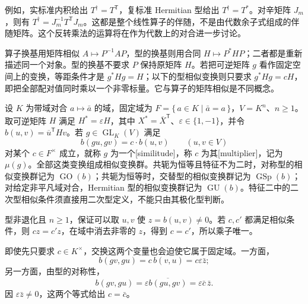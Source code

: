例如，实标准内积给出 \(T^\dagger=T^{\mathsf T}\)，复标准 Hermitian 型给出 \(T^\dagger=T^*\)。对辛矩阵 \(J_m\)，则有 \(T^\dagger=J_m^{-1}T^{\mathsf T}J_m\)。这都是整个线性算子的伴随，不是由代数余子式组成的伴随矩阵。这个反转乘法的运算将在作为代数上的对合进一步讨论。

\ProseParagraphBreak
算子换基用矩阵相似 \(A\mapsto P^{-1}AP\)，型的换基则用合同 \(H\mapsto P^*HP\)；二者都是重新描述同一个对象。型的换基不要求 \(P\) 保持原矩阵 \(H\)。若把可逆矩阵 \(g\) 看作固定空间上的变换，等距条件才是 \(g^*Hg=H\)；以下的型相似变换则只要求 \(g^*Hg=cH\)，即把全部配对值同时乘以一个非零标量。它与算子的矩阵相似是不同概念。

\begin{definition}\label{b2:def:form-similitude}
	设 \(K\) 为带域对合 \(a\mapsto\bar a\) 的域，固定域为 \(F=\{\,a\in K\mid\bar a=a\,\}\)，\(V=K^n\)、\(n\ge1\)。取可逆矩阵 \(H\) 满足 \(H^*=\varepsilon H\)，其中 \(X^*=\overline X^{\mathsf T}\)、\(\varepsilon\in\{1,-1\}\)，并令 \(b(u,v)=\overline u^{\mathsf T}Hv\)。若 \(g\in\operatorname{GL}_K(V)\) 满足
	\[
		b(gu,gv)=c\cdot b(u,v)\qquad(u,v\in V)
	\]
	对某个 \(c\in F^\times\) 成立，就称 \(g\) 为一个[similitude]，称 \(c\) 为其[multiplier]，记为 \(\mu(g)\)。全部这类变换组成相似变换群。共轭为恒等且特征不为二时，对称型的相似变换群记为 \(\operatorname{GO}(b)\)；共轭为恒等时，交替型的相似变换群记为 \(\operatorname{GSp}(b)\)；对给定非平凡域对合，Hermitian 型的相似变换群记为 \(\operatorname{GU}(b)\)。特征二中的二次型相似条件须直接用二次型定义，不能只由其极化型判断。
\end{definition}

型非退化且 \(n\ge1\)，保证可以取 \(u,v\) 使 \(z=b(u,v)\ne0\)。若 \(c,c'\) 都满足相似条件，则 \(cz=c'z\)，在域中消去非零的 \(z\)，得到 \(c=c'\)，所以乘子唯一。

\ProseParagraphBreak
即使先只要求 \(c\in K^\times\)，交换这两个变量也会迫使它属于固定域。一方面，
\[
	b(gv,gu)=c\,b(v,u)=c\varepsilon\bar z;
\]
另一方面，由型的对称性，
\[
	b(gv,gu)=\varepsilon\overline{b(gu,gv)} =\varepsilon\bar c\,\bar z.
\]
因 \(\varepsilon\bar z\ne0\)，这两个等式给出 \(c=\bar c\)。

